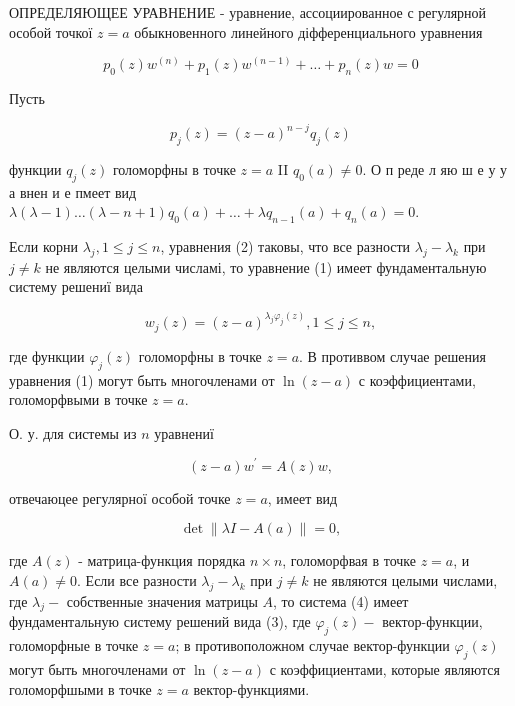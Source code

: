 \documentclass[10pt]{article}
\begin{document}
ОПРЕДЕЛЯЮЩЕЕ УРАВНЕНИЕ - уравнение, ассоциированное с регулярной особой точкої $z=a$ обыкновенного линейного діфференциального уравнения



\[

p_{0}(z) w^{(n)}+p_{1}(z) w^{(n-1)}+\ldots+p_{n}(z) w=0

\]



Пусть



\[

p_{j}(z)=(z-a)^{n-j} q_{j}(z)

\]



функции $q_{j}(z)$ голоморфны в точке $z=a$ II $q_{0}(a) \neq 0$. О п реде л яю ш е у у а внен и е пмеет вид $\lambda(\lambda-1) \ldots(\lambda-n+1) q_{0}(a)+\ldots+\lambda q_{n-1}(a)+q_{n}(a)=0$.



Если корни $\lambda_{j}, 1 \leqslant j \leqslant n$, уравнения (2) таковы, что все разности $\lambda_{j}-\lambda_{k}$ при $j \neq k$ не являются целыми числамі, то уравнение (1) имеет фундаментальную систему решениї вида



\[

w_{j}(z)=(z-a)^{\lambda_{j} \varphi_{j}(z)}, 1 \leqslant j \leqslant n,

\]



где функции $\varphi_{j}(z)$ голоморфны в точке $z=a$. В противвом случае решения уравнения (1) могут быть многочленами от $\ln (z-a)$ с коэффициентами, голоморфвыми в точке $z=a$.



О. у. для системы из $n$ уравнениї



\[

(z-a) w^{\prime}=A(z) w,

\]



отвечаюцее регулярної особой точке $z=a$, имеет вид



\[

\operatorname{det}\|\lambda I-A(a)\|=0,

\]



где $A(z)$ - матрица-функция порядка $n \times n$, голоморфвая в точке $z=a$, и $A(a) \neq 0$. Если все разности $\lambda_{j}-\lambda_{k}$ при $j \neq k$ не являются целыми числами, где $\lambda_{j}-$ собственные значения матрицы $A$, то система (4) имеет фундаментальную систему решений вида (3), где $\varphi_{j}(z)-$ вектор-функции, голоморфные в точке $z=a$; в противоположном случае вектор-функции $\varphi_{j}(z)$ могут быть многочленами от $\ln (z-a)$ с коэффициентами, которые являются голоморфшыми в точке $z=a$ вектор-функциями.
\end{document}
